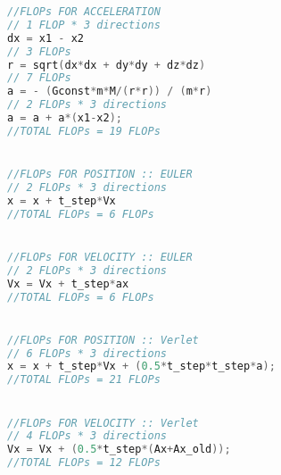 \usepackage{listings}

\begin{lstlisting}[language=c++]
//FLOPs FOR ACCELERATION
// 1 FLOP * 3 directions
dx = x1 - x2
// 3 FLOPs
r = sqrt(dx*dx + dy*dy + dz*dz)
// 7 FLOPs
a = - (Gconst*m*M/(r*r)) / (m*r)
// 2 FLOPs * 3 directions
a = a + a*(x1-x2);																	
//TOTAL FLOPs = 19 FLOPs 


//FLOPs FOR POSITION :: EULER
// 2 FLOPs * 3 directions
x = x + t_step*Vx															
//TOTAL FLOPs = 6 FLOPs 


//FLOPs FOR VELOCITY :: EULER
// 2 FLOPs * 3 directions
Vx = Vx + t_step*ax															
//TOTAL FLOPs = 6 FLOPs 


//FLOPs FOR POSITION :: Verlet
// 6 FLOPs * 3 directions
x = x + t_step*Vx + (0.5*t_step*t_step*a);
//TOTAL FLOPs = 21 FLOPs


//FLOPs FOR VELOCITY :: Verlet
// 4 FLOPs * 3 directions
Vx = Vx + (0.5*t_step*(Ax+Ax_old));
//TOTAL FLOPs = 12 FLOPs
\end{lstlisting}

